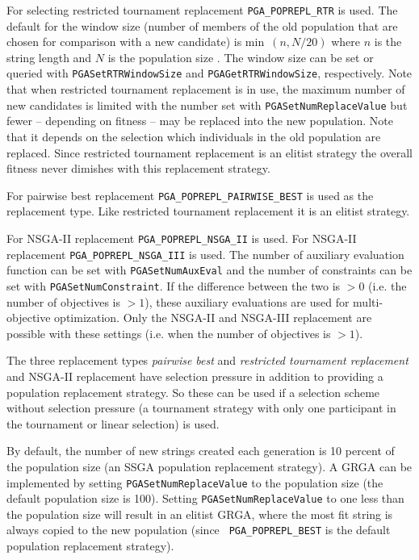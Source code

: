 \documentclass{report}
\begin{document}
For selecting restricted
tournament replacement \verb+PGA_POPREPL_RTR+ is used. The default for
the window size (number of members of the old population that are chosen
for comparison with a new candidate) is \hbox{min $(n, N/20)$} where $n$
is the string length and $N$ is the population size \cite{Pel05}.
The window size can be set or queried
with \verb+PGASetRTRWindowSize+ and \verb+PGAGetRTRWindowSize+,
respectively. Note that when restricted tournament replacement is in
use, the maximum number of new candidates is limited with the number set
with \verb+PGASetNumReplaceValue+ but fewer -- depending on fitness --
may be replaced into the new population. Note that it depends on the
selection which individuals in the old population are replaced. Since
restricted tournament replacement is an elitist strategy the overall
fitness never dimishes with this replacement strategy.

For pairwise best replacement \verb+PGA_POPREPL_PAIRWISE_BEST+ is used
as the replacement type. Like restricted tournament replacement it is an
elitist strategy.

For NSGA-II replacement \verb+PGA_POPREPL_NSGA_II+ is used. For NSGA-II
replacement \verb+PGA_POPREPL_NSGA_III+ is used.  The number
of auxiliary evaluation function can be set with \verb+PGASetNumAuxEval+
and the number of constraints can be set with \verb+PGASetNumConstraint+.
If the difference between the two is $>0$ (i.e. the number of objectives
is $>1$), these auxiliary evaluations are used for multi-objective
optimization. Only the NSGA-II and NSGA-III replacement are possible
with these settings (i.e. when the number of objectives is $>1$).

The three replacement types \textit{pairwise best} and \textit{restricted
tournament replacement} and NSGA-II replacement have selection pressure
in addition to providing
a population replacement strategy. So these can be used if a selection
scheme without selection pressure (a tournament strategy with only one
participant in the tournament or linear selection) is used.

By default, the number of new strings created each generation is 10 percent
of the population size (an SSGA population replacement strategy).  A GRGA can
be implemented by setting {\tt PGASetNumReplaceValue} to the population size
(the default population size is 100).  Setting {\tt PGASetNumReplaceValue} to
one less than the population size will result in an elitist GRGA, where the
most fit string is always copied to the new population (since {\tt
PGA\_POPREPL\_BEST} is the default population replacement strategy).
\end{document}
